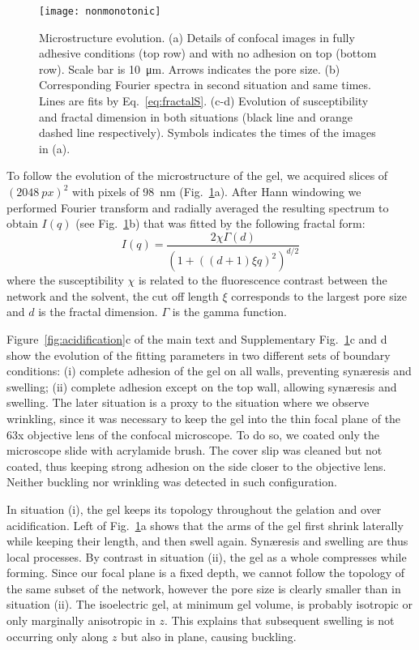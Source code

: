 \documentclass[twocolumn,superscriptaddress,showpacs,preprintnumbers,
amsmath,amssymb,prl]{revtex4-1}
\begin{document}
\begin{figure}[b]
	\texttt{[image: nonmonotonic]}%
	\caption{Microstructure evolution. (a) Details of confocal images in fully adhesive conditions (top row) and with no adhesion on top (bottom row). Scale bar is \SI{10}{\micro\metre}. Arrows indicates the pore size. (b) Corresponding Fourier spectra in second situation and same times. Lines are fits by Eq.~\ref{eq:fractalS}. (c-d) Evolution of susceptibility and fractal dimension in both situations (black line and orange dashed line respectively). Symbols indicates the times of the images in (a).}%
	\label{fig:nonmonotonic}%
\end{figure}

To follow the evolution of the microstructure of the gel, we acquired slices of $(\SI{2048}{px})^2$ with pixels of \SI{98}{\nano\metre} (Fig.~\ref{fig:nonmonotonic}a). After Hann windowing we performed Fourier transform and radially averaged the resulting spectrum to obtain $I(q)$ (see Fig.~\ref{fig:nonmonotonic}b) that was fitted by the following fractal form:
\begin{equation}
I(q) = \frac{2\chi\Gamma(d)}{\left(1+\left((d+1)\xi q\right)^2\right)^{d/2}}
\label{eq:fractalS}
\end{equation}
where the susceptibility $\chi$ is related to the fluorescence contrast between the network and the solvent, the cut off length $\xi$ corresponds to the largest pore size and $d$ is the fractal dimension. $\Gamma$ is the gamma function. 

Figure~\ref{fig:acidification}c of the main text and Supplementary Fig.~\ref{fig:nonmonotonic}c and d show the evolution of the fitting parameters in two different sets of boundary conditions: (i) complete adhesion of the gel on all walls, preventing syn\ae{}resis and swelling; (ii) complete adhesion except on the top wall, allowing syn\ae{}resis and swelling. The later situation is a proxy to the situation where we observe wrinkling, since it was necessary to keep the gel into the thin focal plane of the 63x objective lens of the confocal microscope. To do so, we coated only the microscope slide with acrylamide brush. The cover slip was cleaned but not coated, thus keeping strong adhesion on the side closer to the objective lens. Neither buckling nor wrinkling was detected in such configuration.

In situation (i), the gel keeps its topology throughout the gelation and over acidification. Left of Fig.~\ref{fig:nonmonotonic}a shows that the arms of the gel first shrink laterally while keeping their length, and then swell again. Syn\ae{}resis and swelling are thus local processes. By contrast in situation (ii), the gel as a whole compresses while forming. Since our focal plane is a fixed depth, we cannot follow the topology of the same subset of the network, however the pore size is clearly smaller than in situation (ii). The isoelectric gel, at minimum gel volume, is probably isotropic or only marginally anisotropic in $z$. This explains that subsequent swelling is not occurring only along $z$ but also in plane, causing buckling.
\end{document}
